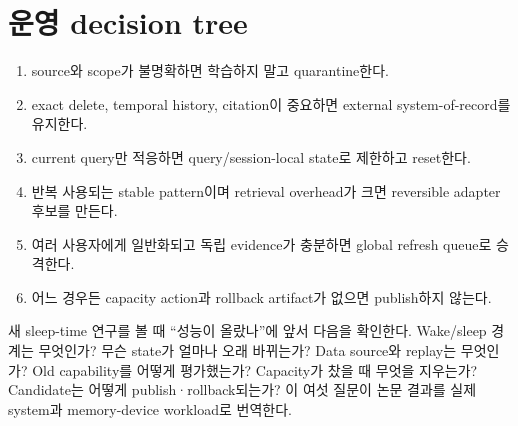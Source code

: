 \section{운영 decision tree}

\begin{enumerate}
  \item source와 scope가 불명확하면 학습하지 말고 quarantine한다.
  \item exact delete, temporal history, citation이 중요하면 external system-of-record를 유지한다.
  \item current query만 적응하면 query/session-local state로 제한하고 reset한다.
  \item 반복 사용되는 stable pattern이며 retrieval overhead가 크면 reversible adapter 후보를 만든다.
  \item 여러 사용자에게 일반화되고 독립 evidence가 충분하면 global refresh queue로 승격한다.
  \item 어느 경우든 capacity action과 rollback artifact가 없으면 publish하지 않는다.
\end{enumerate}

\begin{keypoint}
새 sleep-time 연구를 볼 때 ``성능이 올랐나''에 앞서 다음을 확인한다. Wake/sleep 경계는 무엇인가?
무슨 state가 얼마나 오래 바뀌는가? Data source와 replay는 무엇인가? Old capability를 어떻게 평가했는가?
Capacity가 찼을 때 무엇을 지우는가? Candidate는 어떻게 publish·rollback되는가? 이 여섯 질문이 논문
결과를 실제 system과 memory-device workload로 번역한다.
\end{keypoint}

